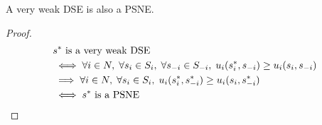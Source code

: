 \begin{theorem}
A very weak DSE is also a PSNE.
\end{theorem}
\begin{proof}
\begin{align*}
& s^* \textrm{ is a very weak DSE}
\\ &\iff \forall i \in N, \; \forall s_i \in S_i, \; \forall s_{-i} \in S_{-i},
    \; u_i(s^*_i, s_{-i}) \ge u_i(s_i, s_{-i})
\\ &\implies \forall i \in N, \; \forall s_i \in S_i,
    \; u_i(s^*_i, s^*_{-i}) \ge u_i(s_i, s^*_{-i})
\\ &\iff s^* \textrm{ is a PSNE}
\qedhere \end{align*}
\end{proof}



